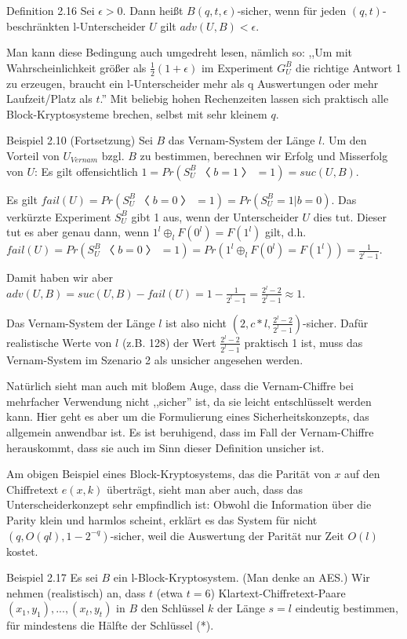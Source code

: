 \documentclass[a4paper]{article}
\begin{document}
\begin{multicols}{3}
        Definition 2.16 Sei $\epsilon>0$. Dann heißt $B(q,t,\epsilon)$-sicher, wenn für jeden $(q,t)$-beschränkten l-Unterscheider $U$ gilt $adv(U,B)< \epsilon$.

        Man kann diese Bedingung auch umgedreht lesen, nämlich so: ,,Um mit Wahrscheinlichkeit größer als $\frac{1}{2}(1 +\epsilon)$ im Experiment $G^B_U$ die richtige Antwort 1 zu erzeugen, braucht ein l-Unterscheider mehr als q Auswertungen oder mehr Laufzeit/Platz als $t$.''  Mit beliebig hohen Rechenzeiten lassen sich praktisch alle Block-Kryptosysteme brechen, selbst mit sehr kleinem $q$.

        Beispiel 2.10 (Fortsetzung) Sei $B$ das Vernam-System der Länge $l$. Um den Vorteil von $U_{Vernam}$ bzgl. $B$ zu bestimmen, berechnen wir Erfolg und Misserfolg von $U$: Es gilt offensichtlich $1=Pr(S^B_U〈b= 1〉= 1) = suc(U,B)$.

        Es gilt $fail(U) = Pr(S^B_U〈b= 0〉= 1) = Pr(S_U^B= 1|b= 0)$. Das verkürzte Experiment $S_U^B$ gibt 1 aus, wenn der Unterscheider $U$ dies tut. Dieser tut es aber genau dann, wenn $1^l\oplus_l F(0^l) =F(1^l)$ gilt, d.h. $fail(U) = Pr(S_U^B〈b= 0〉= 1) = Pr(1^l\oplus_l F(0^l) =F(1^l)) = \frac{1}{2^l- 1}$.

        Damit haben wir aber $adv(U,B) = suc(U,B)-fail(U) = 1-\frac{1}{2^l- 1}=\frac{2^l-2}{2^l-1}\approx 1$.

        Das Vernam-System der Länge $l$ ist also nicht $(2,c*l,\frac{2^l- 2}{2^l- 1})$-sicher. Dafür realistische Werte von $l$ (z.B. 128) der Wert $\frac{2^l-2}{2^l-1}$ praktisch 1 ist, muss das Vernam-System im Szenario 2 als unsicher angesehen werden.

        Natürlich sieht man auch mit bloßem Auge, dass die Vernam-Chiffre bei mehrfacher Verwendung nicht ,,sicher'' ist, da sie leicht entschlüsselt werden kann. Hier geht es aber um die Formulierung eines Sicherheitskonzepts, das allgemein anwendbar ist. Es ist beruhigend, dass im Fall der Vernam-Chiffre herauskommt, dass sie auch im Sinn dieser Definition unsicher ist.

        Am obigen Beispiel eines Block-Kryptosystems, das die Parität von $x$ auf den Chiffretext $e(x,k)$ überträgt, sieht man aber auch, dass das Unterscheiderkonzept sehr empfindlich ist: Obwohl die Information über die Parity klein und harmlos scheint, erklärt es das System für nicht $(q,O(ql), 1-2^{-q})$-sicher, weil die Auswertung der Parität nur Zeit $O(l)$ kostet.

        Beispiel 2.17 Es sei $B$ ein l-Block-Kryptosystem. (Man denke an AES.) Wir nehmen (realistisch) an, dass $t$ (etwa $t=6$) Klartext-Chiffretext-Paare $(x_1,y_1),...,(x_t,y_t)$ in $B$ den Schlüssel $k$ der Länge $s=l$ eindeutig bestimmen, für mindestens die Hälfte der Schlüssel (*).


\end{multicols}
\end{document}
